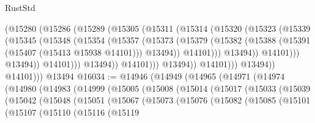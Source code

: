 \begin{lexlean}{RustStd}
\begin{coremodule}
                              (@15280
                                (@15286
                                  (@15289
                                    (@15305
                                      (@15311
                                        (@15314
                                          (@15320
                                            (@15323
                                              (@15339
                                                (@15345
                                                  (@15348
                                                    (@15354
                                                      (@15357
                                                        (@15373
                                                          (@15379
                                                            (@15382
                                                              (@15388
                                                                (@15391
                                                                  (@15407 (@15413 @15938 @14101)))
                                                                @13494))
                                                            @14101)))
                                                      @13494))
                                                  @14101)))
                                            @13494))
                                        @14101)))
                                  @13494))
                              @14101)))
                        @13494))
                    @14101)))
              @13494))
          @14101)))
    @13494
@16034 := @14946
    (@14949
      (@14965
        (@14971
          (@14974
            (@14980
              (@14983
                (@14999
                  (@15005
                    (@15008
                      (@15014
                        (@15017
                          (@15033
                            (@15039
                              (@15042
                                (@15048
                                  (@15051
                                    (@15067
                                      (@15073
                                        (@15076
                                          (@15082
                                            (@15085
                                              (@15101
                                                (@15107
                                                  (@15110
                                                    (@15116
                                                      (@15119

\end{coremodule}
\end{lexlean}
